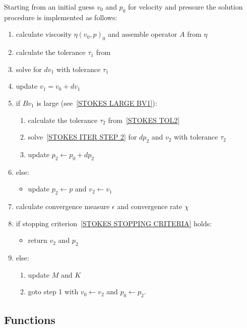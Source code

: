 Starting from an initial guess $v_{0}$ and $p_{0}$ for velocity and pressure
the solution procedure is implemented as follows:
\begin{enumerate}
 \item calculate viscosity $\eta(v_{0},p)_{0}$ and assemble operator $A$ from $\eta$
 \item calculate the tolerance $\tau_{1}$ from 
 \item solve  for $dv_{1}$ with tolerance $\tau_{1}$
 \item update $v_{1}= v_{0}+ dv_{1}$
 \item if $Bv_{1}$ is large (see~\ref{STOKES LARGE BV1}):
 \begin{enumerate}
   \item calculate the tolerance $\tau_{2}$ from~\ref{STOKES TOL2}
   \item solve~\ref{STOKES ITER STEP 2} for $dp_{2}$ and $v_{2}$ with tolerance $\tau_{2}$
   \item update $p_{2}\leftarrow p_{0}+ dp_{2}$
 \end{enumerate}
 \item else:
  \begin{itemize}
    \item update $p_{2}\leftarrow p$ and $v_{2}\leftarrow v_{1}$
  \end{itemize}
 \item calculate convergence measure $\epsilon$ and convergence rate $\chi$
 \item if stopping criterion~\ref{STOKES STOPPING CRITERIA} holds:
 \begin{itemize}
   \item return $v_{2}$ and $p_{2}$
 \end{itemize}
 \item else:
 \begin{enumerate}
   \item update $M$ and $K$
   \item goto step 1 with $v_{0}\leftarrow v_{2}$ and $p_{0}\leftarrow p_{2}$.
 \end{enumerate}
\end{enumerate}

\subsection{Functions}

